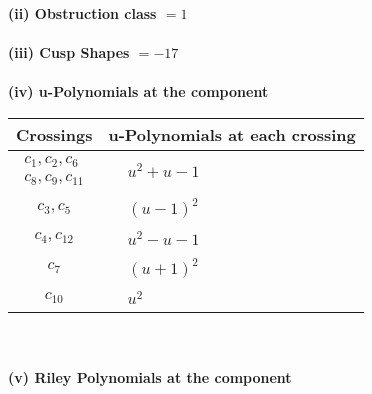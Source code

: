 \documentclass[1p]{elsarticle_modified}
\theoremstyle{definition}
\begin{document}
\flushleft \textbf{(ii) Obstruction class $= 1$}\\~\\
\flushleft \textbf{(iii) Cusp Shapes $= -17$}\\~\\
\newpage\renewcommand{\arraystretch}{1}
\flushleft \textbf{(iv) u-Polynomials at the component}\newline \\
\begin{tabular}{m{50pt}|m{274pt}}
Crossings & \hspace{64pt}u-Polynomials at each crossing \\
\hline $$\begin{aligned}c_{1},c_{2},c_{6}\\c_{8},c_{9},c_{11}\end{aligned}$$&$\begin{aligned}
&u^2+u-1
\end{aligned}$\\
\hline $$\begin{aligned}c_{3},c_{5}\end{aligned}$$&$\begin{aligned}
&(u-1)^2
\end{aligned}$\\
\hline $$\begin{aligned}c_{4},c_{12}\end{aligned}$$&$\begin{aligned}
&u^2- u-1
\end{aligned}$\\
\hline $$\begin{aligned}c_{7}\end{aligned}$$&$\begin{aligned}
&(u+1)^2
\end{aligned}$\\
\hline $$\begin{aligned}c_{10}\end{aligned}$$&$\begin{aligned}
&u^2
\end{aligned}$\\
\hline
\end{tabular}\\~\\
\newpage\renewcommand{\arraystretch}{1}
\flushleft \textbf{(v) Riley Polynomials at the component}\newline \\
\end{document}
